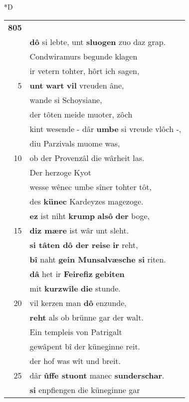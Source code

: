 \documentclass[8pt,a4paper,notitlepage]{article}
\begin{document}
\begin{table}[ht]
\begin{minipage}[t]{0.5\linewidth}
\small
\begin{center}*D
\end{center}
\begin{tabular}{rl}
\textbf{805} & \textit{\begin{large}D\end{large}}iu \textbf{magetuomlîch minne im} gap,\\ 
 & \textbf{dô} si lebte, unt \textbf{sluogen} zuo daz grap.\\ 
 & Condwiramurs begunde klagen\\ 
 & ir vetern tohter, hôrt ich sagen,\\ 
5 & \textbf{unt} \textbf{wart} \textbf{vil} vreuden âne,\\ 
 & wande si Schoysiane,\\ 
 & der tôten meide muoter, zôch\\ 
 & kint wesende - dâr \textbf{umbe} si vreude vlôch -,\\ 
 & diu Parzivals muome was,\\ 
10 & ob der Provenzâl die wârheit las.\\ 
 & Der herzoge Kyot\\ 
 & wesse wênec umbe sîner tohter tôt,\\ 
 & des \textbf{künec} Kardeyzes magezoge.\\ 
 & \textbf{ez} ist niht \textbf{krump} \textbf{alsô} \textbf{der} boge,\\ 
15 & \textbf{diz mære} ist wâr unt sleht.\\ 
 & \textbf{si tâten dô der reise} \textbf{ir} reht,\\ 
 & \textbf{bî} naht \textbf{gein Munsalvæsche si} riten.\\ 
 & \textbf{dâ} het ir \textbf{Feirefiz} \textbf{gebiten}\\ 
 & mit \textbf{kurzwîle} \textbf{die} stunde.\\ 
20 & vil kerzen man \textbf{dô} enzunde,\\ 
 & \textbf{reht} als ob brünne gar der walt.\\ 
 & Ein templeis von Patrigalt\\ 
 & gewâpent bî der küneginne reit.\\ 
 & der hof was wît und breit.\\ 
25 & dâr \textbf{ûffe stuont} manec \textbf{sunderschar}.\\ 
 & \textbf{si} enpfiengen die küneginne gar\\ 

\end{tabular}
\end{minipage}
\end{table}
\end{document}
